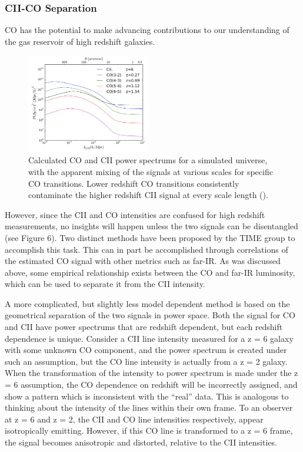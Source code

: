 \documentclass[manuscript]{aastex}
\begin{document}
\subsubsection{\textbf{CII-CO Separation}}
CO has the potential to make advancing contributions to our understanding of the gas reservoir of high redshift galaxies. 
\begin{figure}
\vspace{-0.8cm}
  \begin{center}
    \includegraphics[width=0.48\textwidth]{cheng1.png}
  \end{center}
  \caption[Calculated CO and CII power spectrums, showing the difficulty in separating the two signals. -(\cite{Cheng2016})]{Calculated CO and CII power spectrums for a simulated universe, with the apparent mixing of the signals at various scales for specific CO transitions. Lower redshift CO transitions consistently contaminate the higher redshift CII signal at every scale length (\cite{Cheng2016}).}
\end{figure}
However, since the CII and CO intensities are confused for high redshift measurements, no insights will happen unless the two signals can be disentangled (see Figure 6). Two distinct methods have been proposed by the TIME group to accomplish this task. This can in part be accomplished through correlations of the estimated CO signal with other metrics such as far-IR. As was discussed above, some empirical relationship exists between the CO and far-IR luminosity, which can be used to separate it from the CII intensity.  

A more complicated, but slightly less model dependent method is based on the geometrical separation of the two signals in power space. Both the signal for CO and CII have power spectrums that are redshift dependent, but each redshift dependence is unique. Consider a CII line intensity measured for a z = 6 galaxy with some unknown CO component, and the power spectrum is created under such an assumption, but the CO line intensity is actually from a z = 2 galaxy. When the transformation of the intensity to power spectrum is made under the z = 6 assumption, the CO dependence on redshift will be incorrectly assigned, and show a pattern which is inconsistent with the ``real'' data. This is analogous to thinking about the intensity of the lines within their own frame. To an observer at z = 6 and z = 2, the CII and CO line intensities respectively, appear isotropically emitting. However, if this CO line is transformed to a z = 6 frame, the signal becomes anisotropic and distorted, relative to the CII intensities.  
\end{document}
